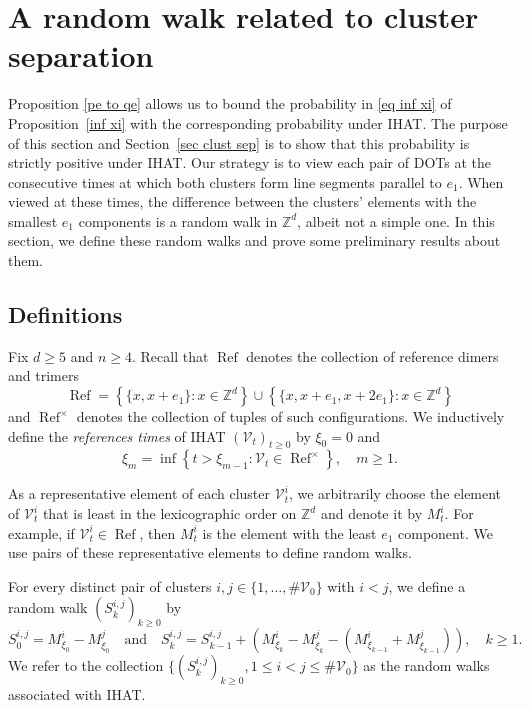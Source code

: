 \documentclass[11pt,reqno]{amsart}
\theoremstyle{definition}
\numberwithin{equation}{section}
\newcommand{\Z}{\mathbb{Z}}
\newcommand{\1}{\mathbf{1}}
\newcommand{\A}{\mathcal{A}}
\renewcommand{\A}{\mathcal{A}}
\DeclareMathOperator{\Refcon}{\mathrm{Ref}}
\newcommand{\VV}{\mathcal{V}}
\DeclareMathOperator{\Conf}{\mathrm{Conf}}
\DeclareMathOperator{\DOT}{\mathrm{Dot}}
\begin{document}
\section{A random walk related to cluster separation}\label{ref times}

Proposition \ref{pe to qe} allows us to bound the probability in \eqref{eq inf xi} of Proposition~\ref{inf xi} with the corresponding probability under IHAT. The purpose of this section and Section~\ref{sec clust sep} is to show that this probability is strictly positive under IHAT. Our strategy is to view each pair of DOTs at the consecutive times at which both clusters form line segments parallel to $e_1$. When viewed at these times, the difference between the clusters' elements with the smallest $e_1$ components is a random walk in $\Z^d$, albeit not a simple one. In this section, we define these random walks and prove some preliminary results about them.


\subsection{Definitions}\label{sub rw def}

Fix $d \geq 5$ and $n \geq 4$. Recall that $\Refcon$ denotes the collection of reference dimers and trimers
\[
\Refcon = \left\{ \{x,x+e_1\}: x \in \Z^d\right\} \cup \left\{\{x, x+e_1, x+2e_1\}: x \in \Z^d\right\}
\]
and $\Refcon^\times$ denotes the collection of tuples of such configurations. 
 We inductively define the {\em references times} of IHAT $(\VV_t)_{t \geq 0}$ by $\xi_0 = 0$ and
\[
\xi_m = \inf\left\{t > \xi_{m-1}: \VV_t \in \Refcon^\times \right\}, \quad m \geq 1.
\]

As a representative element of each cluster $\VV_t^i$, we arbitrarily choose the element of $\VV_t^i$ that is least in the lexicographic order on $\Z^d$ and denote it by $M_t^i$. For example, if $\VV_t^i \in \Refcon$, then $M_t^i$ is the element with the least $e_1$ component. We use pairs of these representative elements to define random walks.

For every distinct pair of clusters $i, j \in \{1, \dots, \# \VV_0\}$ with $i < j$, we define a random walk $(S_k^{i,j})_{k \geq 0}$ by 
\begin{equation}\label{rw assoc w}
S_0^{i,j} = M_{\xi_0}^i - M_{\xi_0}^j \quad \text{and} \quad S_k^{i,j} = S_{k-1}^{i,j} + \left( M_{\xi_k}^i - M_{\xi_k}^j - \left( M_{\xi_{k-1}}^i + M_{\xi_{k-1}}^j\right) \right), \quad k \geq 1.
\end{equation}
We refer to the collection $\{(S_k^{i,j})_{k \geq 0}, 1 \leq i < j \leq \# \VV_0\}$ as the random walks associated with IHAT.
\end{document}
